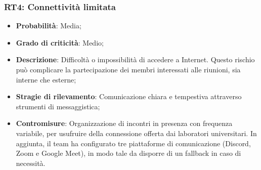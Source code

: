 \subsubsection{RT4: Connettività limitata}
\begin{itemize}
    \item \textbf{Probabilità}: Media;
    \item \textbf{Grado di criticità}: Medio;
    \item \textbf{Descrizione}: Difficoltà o impossibilità di accedere a Internet. Questo rischio può complicare la partecipazione dei membri interessati alle riunioni, sia interne che esterne;
    \item \textbf{Stragie di rilevamento}: Comunicazione chiara e tempestiva attraverso strumenti di messaggistica;
    \item \textbf{Contromisure}: Organizzazione di incontri in presenza con frequenza variabile, per usufruire della connessione offerta dai laboratori universitari. In aggiunta, il team ha configurato tre piattaforme di comunicazione (Discord, Zoom e Google Meet), in modo tale da disporre di un fallback in caso di necessità.
\end{itemize}
